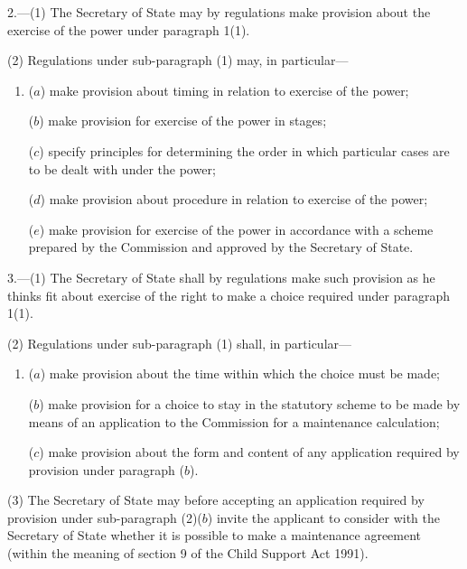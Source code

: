 \documentclass[12pt,a4paper]{article}
\begin{document}

\medskip

2.---(1) The Secretary of State may by regulations make provision about the exercise of the power under paragraph 1(1).

(2) Regulations under sub-paragraph (1) may, in particular—
\begin{enumerate}\item[]
($a$) make provision about timing in relation to exercise of the power;

($b$) make provision for exercise of the power in stages;

($c$) specify principles for determining the order in which particular cases are to be dealt with under the power;

($d$) make provision about procedure in relation to exercise of the power;

($e$) make provision for exercise of the power in accordance with a scheme prepared by the Commission and approved by the Secretary of State.
\end{enumerate}


\medskip

3.---(1) The Secretary of State shall by regulations make such provision as he thinks fit about exercise of the right to make a choice required under paragraph 1(1).

(2) Regulations under sub-paragraph (1) shall, in particular—
\begin{enumerate}\item[]
($a$) make provision about the time within which the choice must be made;

($b$) make provision for a choice to stay in the statutory scheme to be made by means of an application to the Commission for a maintenance calculation;

($c$) make provision about the form and content of any application required by provision under paragraph ($b$).
\end{enumerate}

(3) The 
Secretary of State  %
may before accepting an application required by provision under sub-paragraph (2)($b$) invite the applicant to consider with the 
Secretary of State  %
whether it is possible to make a maintenance agreement (within the meaning of section 9 of the Child Support Act 1991).
\end{document}

